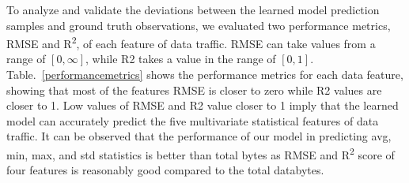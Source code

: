 \documentclass[10pt, conference]{IEEEtran}
\begin{document}
To analyze and validate the deviations between the learned model prediction samples and ground truth observations, we evaluated two performance metrics, RMSE and R\textsuperscript{2}, of each feature of data traffic. RMSE can take values from a range of $[0,\infty]$, while R2 takes a value in the range of $[0,1]$.
Table.~\ref{performancemetrics} shows the performance metrics for each data feature, showing that most of the features RMSE is closer to zero while R2 values are closer to 1. Low values of RMSE and R2 value closer to 1 imply that the learned model can accurately predict the five multivariate statistical features of data traffic. It can be observed that the performance of our model in predicting avg, min, max, and std statistics is better than total bytes as RMSE and R\textsuperscript{2} score of four features is reasonably good compared to the total databytes. 
\vspace{-5pt}

\end{document}
